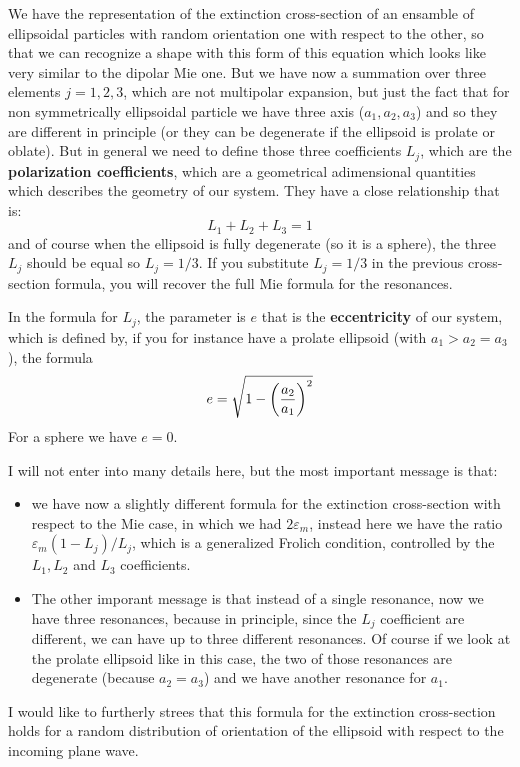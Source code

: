 \documentclass[../main/main.tex]{subfiles}
\begin{document}
We have the representation of the extinction cross-section of an ensamble of ellipsoidal particles with random orientation one with respect to the other, so that we can recognize a shape with this form of this equation which looks like very similar to the dipolar Mie one.
But we have now a summation over three elements \( j=1,2,3 \), which are not multipolar expansion, but just the fact that for non symmetrically ellipsoidal particle we have three axis (\( a_1,a_2,a_3 \)) and so they are different in principle (or they can be degenerate if the ellipsoid is prolate or oblate). But in general we need to define those three coefficients \( L_j \), which are the \textbf{polarization coefficients}, which are a geometrical adimensional quantities which describes the geometry of our system. They have a close relationship that is:
\begin{equation*}
  L_1 + L_2 + L_3 =1
\end{equation*}
and of course when the ellipsoid is fully degenerate (so it is a sphere), the three \( L_j \) should be equal so \( L_j = 1/3 \). If you substitute \( L_j = 1/3 \) in the previous cross-section formula, you will recover the full Mie formula for the resonances.

In the formula for \( L_j \), the parameter is \( e \) that is the \textbf{eccentricity}  of our system, which is defined by, if you for instance have a prolate ellipsoid (with \( a_1>a_2=a_3 \)), the formula
\begin{equation*}
  e = \sqrt{1 - \qty(\frac{a_2}{a_1})^2 }
\end{equation*}
For a sphere we have \( e=0 \).

I will not enter into many details here, but the most important message is that:
\begin{itemize}
\item  we have now a slightly different formula for the extinction cross-section with respect to the Mie case, in which we had \( 2 \varepsilon _m \), instead here we have the ratio \( \varepsilon _m (1-L_j)/L_j \), which is a generalized Frolich condition, controlled by the \( L_1,L_2  \) and \( L_3 \) coefficients.

\item The other imporant message is that instead of a single resonance, now we have three resonances, because in principle, since the \( L_j \) coefficient are different, we can have up to three different resonances. Of course if we look at the prolate ellipsoid like in this case, the two of those resonances are degenerate (because \( a_2=a_3 \)) and we have another resonance for \( a_1 \).
\end{itemize}
I would like to furtherly strees that this formula for the extinction cross-section holds for a random distribution of orientation of the ellipsoid with respect to the incoming plane wave.
\end{document}
